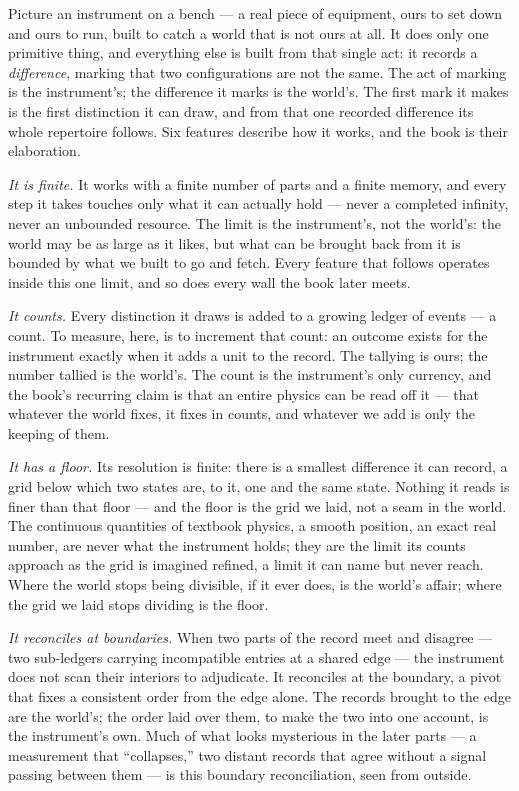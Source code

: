 Picture an instrument on a bench --- a real piece of equipment, ours to set down and ours to run, built to
catch a world that is not ours at all. It does only one primitive thing, and everything else is built from
that single act: it records a \emph{difference}, marking that two configurations are not the same. The act of
marking is the instrument's; the difference it marks is the world's. The first mark it makes is the first
distinction it can draw, and from that one recorded difference its whole repertoire follows. Six features
describe how it works, and the book is their elaboration.

\emph{It is finite.} It works with a finite number of parts and a finite memory, and every step it takes
touches only what it can actually hold --- never a completed infinity, never an unbounded resource. The limit
is the instrument's, not the world's: the world may be as large as it likes, but what can be brought back from
it is bounded by what we built to go and fetch. Every feature that follows operates inside this one limit, and
so does every wall the book later meets.

\emph{It counts.} Every distinction it draws is added to a growing ledger of events --- a count. To measure,
here, is to increment that count: an outcome exists for the instrument exactly when it adds a unit to the
record. The tallying is ours; the number tallied is the world's. The count is the instrument's only currency,
and the book's recurring claim is that an entire physics can be read off it --- that whatever the world fixes,
it fixes in counts, and whatever we add is only the keeping of them.

\emph{It has a floor.} Its resolution is finite: there is a smallest difference it can record, a grid below
which two states are, to it, one and the same state. Nothing it reads is finer than that floor --- and the
floor is the grid we laid, not a seam in the world. The continuous quantities of textbook physics, a smooth
position, an exact real number, are never what the instrument holds; they are the limit its counts approach as
the grid is imagined refined, a limit it can name but never reach. Where the world stops being divisible, if
it ever does, is the world's affair; where the grid we laid stops dividing is the floor.

\emph{It reconciles at boundaries.} When two parts of the record meet and disagree --- two sub-ledgers carrying
incompatible entries at a shared edge --- the instrument does not scan their interiors to adjudicate. It
reconciles at the boundary, a pivot that fixes a consistent order from the edge alone. The records brought to
the edge are the world's; the order laid over them, to make the two into one account, is the instrument's own.
Much of what looks mysterious in the later parts --- a measurement that ``collapses,'' two distant records that
agree without a signal passing between them --- is this boundary reconciliation, seen from outside.


